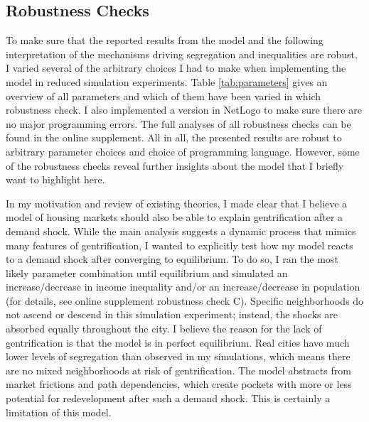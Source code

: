 \subsection{Robustness Checks}

To make sure that the reported results from the model and the following interpretation of the mechanisms driving segregation and inequalities are robust, I varied several of the arbitrary choices I had to make when implementing the model in reduced simulation experiments. Table \ref{tab:parameters} gives an overview of all parameters and which of them have been varied in which robustness check. I also implemented a version in NetLogo to make sure there are no major programming errors. The full analyses of all robustness checks can be found in the online supplement. All in all, the presented results are robust to arbitrary parameter choices and choice of programming language. However, some of the robustness checks reveal further insights about the model that I briefly want to highlight here.

In my motivation and review of existing theories, I made clear that I believe a model of housing markets should also be able to explain gentrification after a demand shock. While the main analysis suggests a dynamic process that mimics many features of gentrification, I wanted to explicitly test how my model reacts to a demand shock after converging to equilibrium. To do so, I ran the most likely parameter combination until equilibrium and simulated an increase/decrease in income inequality and/or an increase/decrease in population (for details, see online supplement robustness check C). Specific neighborhoods do not ascend or descend in this simulation experiment; instead, the shocks are absorbed equally throughout the city. I believe the reason for the lack of gentrification is that the model is in perfect equilibrium. Real cities have much lower levels of segregation than observed in my simulations, which means there are no mixed neighborhoods at risk of gentrification. The model abstracts from market frictions and path dependencies, which create pockets with more or less potential for redevelopment after such a demand shock. This is certainly a limitation of this model.

